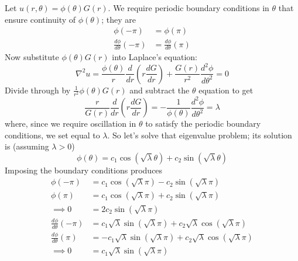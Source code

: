\documentclass[a4paper]{article}
\begin{document}
Let \( u \!\left( r,\theta \right) = \phi \!\left( \theta \right)G \!\left( r \right) \). We require periodic boundary conditions in \( \theta \) that ensure continuity of \( \phi \!\left( \theta \right) \); they are
\begin{align*}
	\phi \!\left( -\pi \right) & = \phi \!\left( \pi \right) \\
	\frac{d \phi}{d \theta}\!\left( -\pi \right) & = \frac{d \phi}{d \theta}\!\left( \pi \right)
\end{align*}
Now substitute \( \phi \!\left( \theta \right) G \!\left( r \right) \) into Laplace's equation:
\[
	\nabla^{2}u = \frac{\phi \!\left( \theta \right)}{r}\frac{d }{d r}\!\left( r \frac{d G}{d r} \right) + \frac{G \!\left( r \right)}{r^{2}}\frac{d^2 \phi}{d \theta^2} = 0
\]
Divide through by \( \displaystyle{\frac{1}{r^{2}}}\phi \!\left( \theta \right)G \!\left( r \right) \) and subtract the \( \theta \) equation to get
\[
	\frac{r}{G \!\left( r \right)}\frac{d }{d r}\!\left( r \frac{d G}{d r} \right) = -\frac{1}{\phi \!\left( \theta \right)}\frac{d^2 \phi}{d \theta^2} = \lambda
\]
where, since we require oscillation in \( \theta \) to satisfy the periodic boundary conditions, we set equal to \( \lambda \). So let's solve that eigenvalue problem; its solution is (assuming \( \lambda > 0 \))
\[
	\phi \!\left( \theta \right) = c_{1}\cos\!\left(\sqrt{\lambda}\theta\right) + c_{2}\sin\!\left(\sqrt{\lambda}\theta\right)
\]
Imposing the boundary conditions produces
\begin{align*}
	\phi \!\left( -\pi \right) & = c_{1}\cos\!\left(\sqrt{\lambda}\pi\right) - c_{2}\sin\!\left(\sqrt{\lambda}\pi\right) \\
	\phi \!\left( \pi \right) & = c_{1}\cos\!\left(\sqrt{\lambda}\pi\right) + c_{2}\sin\!\left(\sqrt{\lambda}\pi\right) \\ 
	\implies 0 & = 2c_{2}\sin\!\left(\sqrt{\lambda}\pi\right) \\
	\frac{d \phi}{d \theta}\!\left( -\pi \right) & = c_{1}\sqrt{\lambda}\sin\!\left(\sqrt{\lambda}\pi\right) + c_{2}\sqrt{\lambda}\cos\!\left(\sqrt{\lambda}\pi\right) \\
	\frac{d \phi}{d \theta}\!\left( \pi \right) & = -c_{1}\sqrt{\lambda}\sin\!\left(\sqrt{\lambda}\pi\right) + c_{2}\sqrt{\lambda}\cos\!\left(\sqrt{\lambda}\pi\right) \\
	\implies 0 & = c_{1}\sqrt{\lambda}\sin\!\left(\sqrt{\lambda}\pi\right)
\end{align*}
\end{document}
